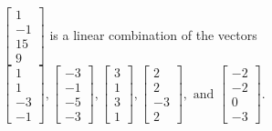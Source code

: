 \begin{exercise}
\begin{exerciseStatement}
  \end{exerciseStatement}
  \begin{exerciseAnswer}
   \(\left[\begin{array}{c}
1 \\
-1 \\
15 \\
9
\end{array}\right]\) 
  	 is  
	a linear combination of the vectors \(\left[\begin{array}{c}
1 \\
1 \\
-3 \\
-1
\end{array}\right] , \left[\begin{array}{c}
-3 \\
-1 \\
-5 \\
-3
\end{array}\right] , \left[\begin{array}{c}
3 \\
1 \\
3 \\
1
\end{array}\right] , \left[\begin{array}{c}
2 \\
2 \\
-3 \\
2
\end{array}\right] , \text{ and } \left[\begin{array}{c}
-2 \\
-2 \\
0 \\
-3
\end{array}\right]\).

	
  


  \end{exerciseAnswer}
\end{exercise}